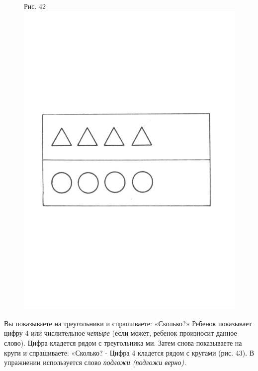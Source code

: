 \documentclass[a5paper]{book}
\renewcommand{\emph}[1]{\textit{#1}}
\begin{document}
\begin{figure}
\centering
Рис. 42 \includegraphics[width=\linewidth]{media/media/image38.png}
\end{figure}

Вы показываете на треугольники и спрашиваете: «Сколько?» Ребенок
показывает цифру 4 или числительное \emph{четыре} (если может, ребенок
произносит данное слово). Цифра кладется рядом с треугольника ми. Затем
снова показываете на круги и спрашиваете: «Сколько? - Цифра 4 кладется
рядом с кругами (рис. 43). В упражнении используется слово \emph{подложи
(подложи верно).}
\end{document}

